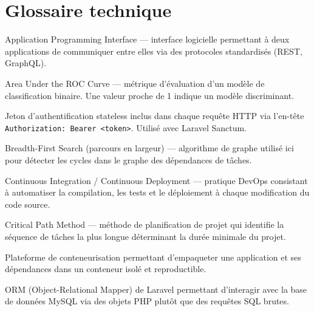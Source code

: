 
\chapter{Glossaire technique}
\label{ann:glossaire}

\begin{description}[leftmargin=4cm, style=nextline]

  \item[API]
  Application Programming Interface — interface logicielle permettant à deux
  applications de communiquer entre elles via des protocoles standardisés (REST, GraphQL).

  \item[AUC ROC]
  Area Under the ROC Curve — métrique d'évaluation d'un modèle de classification
  binaire. Une valeur proche de 1 indique un modèle discriminant.

  \item[Bearer Token]
  Jeton d'authentification stateless inclus dans chaque requête HTTP via l'en-tête
  \texttt{Authorization: Bearer <token>}. Utilisé avec Laravel Sanctum.

  \item[BFS]
  Breadth-First Search (parcours en largeur) — algorithme de graphe utilisé ici
  pour détecter les cycles dans le graphe des dépendances de tâches.

  \item[CI/CD]
  Continuous Integration / Continuous Deployment — pratique DevOps consistant à
  automatiser la compilation, les tests et le déploiement à chaque modification
  du code source.

  \item[CPM]
  Critical Path Method — méthode de planification de projet qui identifie la
  séquence de tâches la plus longue déterminant la durée minimale du projet.

  \item[Docker]
  Plateforme de conteneurisation permettant d'empaqueter une application et ses
  dépendances dans un conteneur isolé et reproductible.

  \item[Eloquent]
  ORM (Object-Relational Mapper) de Laravel permettant d'interagir avec la base
  de données MySQL via des objets PHP plutôt que des requêtes SQL brutes.


\end{description}
